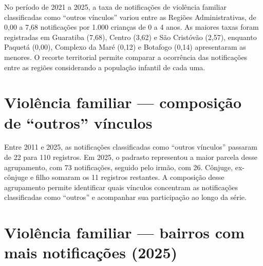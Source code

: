 
No período de 2021 a 2025, a taxa de notificações de violência familiar classificadas como “outros vínculos” variou entre as Regiões Administrativas, de 0,00 a 7,68 notificações por 1.000 crianças de 0 a 4 anos. As maiores taxas foram registradas em Guaratiba (7,68), Centro (3,62) e São Cristóvão (2,57), enquanto Paquetá (0,00), Complexo da Maré (0,12) e Botafogo (0,14) apresentaram as menores. O recorte territorial permite comparar a ocorrência das notificações entre as regiões considerando a população infantil de cada uma.


\section{Violência familiar — composição de “outros” vínculos}


Entre 2011 e 2025, as notificações classificadas como “outros vínculos” passaram de 22 para 110 registros. Em 2025, o padrasto representou a maior parcela desse agrupamento, com 73 notificações, seguido pelo irmão, com 26. Cônjuge, ex-cônjuge e filho somaram os 11 registros restantes. A composição desse agrupamento permite identificar quais vínculos concentram as notificações classificadas como “outros” e acompanhar sua participação ao longo da série.


\section{Violência familiar — bairros com mais notificações (2025)}

